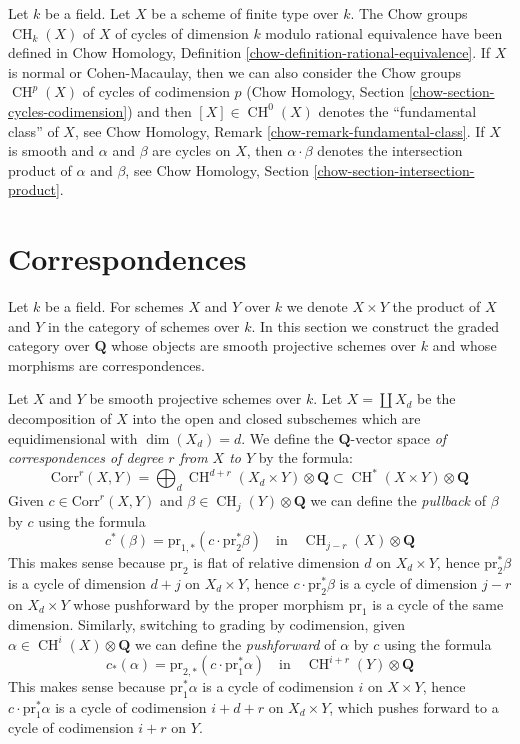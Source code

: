 \documentclass{stacks-project}
\theoremstyle{plain}
\theoremstyle{definition}
\theoremstyle{remark}
\numberwithin{equation}{subsection}
\def\CH{\mathop{\mathrm{CH}}\nolimits}
\begin{document}
\medskip\noindent
Let $k$ be a field. Let $X$ be a scheme of finite type over $k$.
The Chow groups $\CH_k(X)$ of $X$ of cycles of dimension $k$
modulo rational equivalence have been defined in
Chow Homology, Definition \ref{chow-definition-rational-equivalence}.
If $X$ is normal or Cohen-Macaulay, then we can also consider
the Chow groups $\CH^p(X)$ of cycles of codimension $p$
(Chow Homology, Section \ref{chow-section-cycles-codimension})
and then $[X] \in \CH^0(X)$ denotes the ``fundamental class'' of $X$, see
Chow Homology, Remark \ref{chow-remark-fundamental-class}.
If $X$ is smooth and $\alpha$ and $\beta$ are cycles on $X$,
then $\alpha \cdot \beta$ denotes the intersection product of
$\alpha$ and $\beta$, see
Chow Homology, Section \ref{chow-section-intersection-product}.













\section{Correspondences}
\label{section-correspondences}

\noindent
Let $k$ be a field. For schemes $X$ and $Y$ over $k$ we denote
$X \times Y$ the product of $X$ and $Y$ in the category of schemes
over $k$. In this section we construct the graded category over
$\mathbf{Q}$ whose objects are smooth projective schemes over $k$ and whose
morphisms are correspondences.

\medskip\noindent
Let $X$ and $Y$ be smooth projective schemes over $k$.
Let $X = \coprod X_d$ be the decomposition of $X$ into
the open and closed subschemes which are equidimensional
with $\dim(X_d) = d$. We define the $\mathbf{Q}$-vector space
{\it of correspondences of degree $r$ from $X$ to $Y$}
by the formula:
$$
\text{Corr}^r(X, Y) =
\bigoplus\nolimits_d \CH^{d + r}(X_d \times Y) \otimes \mathbf{Q}
\subset
\CH^*(X \times Y) \otimes \mathbf{Q}
$$
Given $c \in \text{Corr}^r(X, Y)$ and $\beta \in \CH_j(Y) \otimes \mathbf{Q}$
we can define the {\it pullback} of $\beta$ by $c$ using the formula
$$
c^*(\beta) = \text{pr}_{1, *}(c \cdot \text{pr}_2^*\beta)
\quad\text{in}\quad
\CH_{j - r}(X) \otimes \mathbf{Q}
$$
This makes sense because $\text{pr}_2$ is flat of relative dimension
$d$ on $X_d \times Y$, hence $\text{pr}_2^*\beta$ is a cycle of
dimension $d + j$ on $X_d \times Y$, hence $c \cdot \text{pr}_2^*\beta$
is a cycle of dimension $j - r$ on $X_d \times Y$ whose pushforward
by the proper morphism $\text{pr}_1$ is a cycle of the same dimension.
Similarly, switching to grading by codimension,
given $\alpha \in \CH^i(X) \otimes \mathbf{Q}$ we can define the
{\it pushforward} of $\alpha$ by $c$ using the formula
$$
c_*(\alpha) = \text{pr}_{2, *}(c \cdot \text{pr}_1^*\alpha)
\quad\text{in}\quad
\CH^{i + r}(Y) \otimes \mathbf{Q}
$$
This makes sense because $\text{pr}_1^*\alpha$ is a cycle of codimension
$i$ on $X \times Y$, hence $c \cdot \text{pr}_1^*\alpha$ is a cycle
of codimension $i + d + r$ on $X_d \times Y$, which pushes forward
to a cycle of codimension $i + r$ on $Y$.
\end{document}
